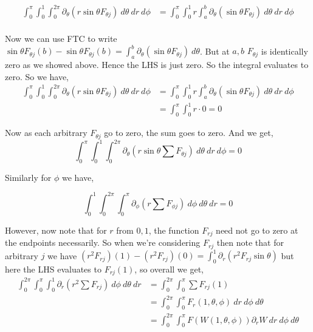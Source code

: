 \documentclass[a4paper]{article}
\begin{document}
\begin{align*}
  \int_{0}^{\pi} \int_{0}^{1} \int_{0}^{2\pi}  \partial_{\theta} \left(r \sin \theta  F_{\theta j}\right) \ d\theta \ dr \ d\phi &=   \int_{0}^{\pi} \int_{0}^{1}r \int_{a}^{b}  \partial_{\theta} \left( \sin \theta  F_{\theta j}\right) \ d\theta \ dr \ d\phi \\
\end{align*}

Now we can use FTC to write $\sin \theta F_{\theta j}(b) -\sin \theta F_{\theta j}(b)  = \int_{a}^{b} \partial_{\theta}(\sin \theta F_{\theta j}) \ d\theta  $. But at $a,b$ $F_{\theta j}$ is identically zero as we showed above. Hence the LHS is just zero. So the integral evaluates to zero.  So we have,
\begin{align*}
  \int_{0}^{\pi} \int_{0}^{1} \int_{0}^{2\pi}  \partial_{\theta} \left(r \sin \theta  F_{\theta j}\right) \ d\theta \ dr \ d\phi &=   \int_{0}^{\pi} \int_{0}^{1}r \int_{a}^{b}  \partial_{\theta} \left( \sin \theta  F_{\theta j}\right) \ d\theta \ dr \ d\phi\\
                                                                                                                                   &= \int_{0}^{\pi} \int_{0}^{1} r \cdot 0 = 0
\end{align*}

Now as each arbitrary $F_{\theta j}$ go to zero, the sum goes to zero. And we get, 
\[
 \int_{0}^{\pi} \int_{0}^{1} \int_{0}^{2\pi}  \partial_{\theta} \left(r \sin \theta \sum F_{\theta j}\right) \ d\theta \ dr \ d\phi = 0
\]

Similarly for $\phi$ we have, 

\[
 \int_{0}^{1} \int_{0}^{2\pi} \int_{0}^{\pi}  \partial_{\phi} \left(r  \sum F_{\phi j }\right) \ d\phi \ d\theta \ dr = 0
\]

However, now note that for $r $ from $0, 1$, the function $F_{rj}$ need not go to zero at the endpoints necessarily. So when we're considering $F_{rj}$ then note that for arbitrary $j $ we have $(r^2F_{rj})(1) - (r^2F_{rj})(0) = \int_{0}^{1} \partial_r (r^2 F_{rj} \sin \theta)$ but here the LHS evaluates to $F_{rj}(1)$, so overall we get,
\begin{align*}
  \int_{0}^{2\pi} \int_{0}^{\pi}   \int_{0}^{1} \partial_{r} \left(r^2  \sum F_{r j }\right) \ d\phi \ d\theta \ dr &= \int_{0}^{2\pi} \int_{0}^{\pi} \sum F_{rj}(1)\\
 &= \int_{0}^{2\pi} \int_{0}^{\pi} F_r(1, \theta, \phi) \ dr \ d \phi \ d \theta \\
 &= \int_{0}^{2\pi} \int_{0}^{\pi} F(W(1, \theta, \phi)) \partial_r W \ dr \ d \phi \ d \theta \\
\end{align*}
\end{document}
